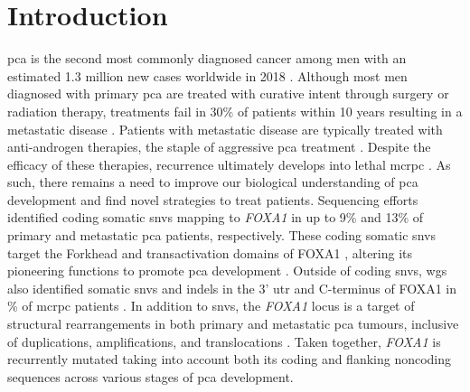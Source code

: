 \section{Introduction}

\Gls{pca} is the second most commonly diagnosed cancer among men with an estimated 1.3 million new cases worldwide in 2018 \cite{brayGlobalCancerStatistics2018}.
Although most men diagnosed with primary \gls{pca} are treated with curative intent through surgery or radiation therapy, treatments fail in 30\% of patients within 10 years \cite{boorjianLongTermOutcomeRadical2007} resulting in a metastatic disease \cite{litwinDiagnosisTreatmentProstate2017}.
Patients with metastatic disease are typically treated with anti-androgen therapies, the staple of aggressive \gls{pca} treatment \cite{attardProstateCancer2016}.
Despite the efficacy of these therapies, recurrence ultimately develops into lethal \gls{mcrpc} \cite{attardProstateCancer2016}.
As such, there remains a need to improve our biological understanding of \gls{pca} development and find novel strategies to treat patients.
Sequencing efforts identified coding somatic \glspl{snv} mapping to \emph{FOXA1} in up to 9\% \cite{abeshouseMolecularTaxonomyPrimary2015,fraserGenomicHallmarksLocalized2017,barbieriExomeSequencingIdentifies2012, grassoMutationalLandscapeLethal2012,paroliaDistinctStructuralClasses2019,adamsFOXA1MutationsAlter2019} and 13\% \cite{paroliaDistinctStructuralClasses2019,adamsFOXA1MutationsAlter2019,robinsonIntegrativeClinicalGenomics2015} of primary and metastatic \gls{pca} patients, respectively.
These coding somatic \glspl{snv} target the Forkhead and transactivation domains of FOXA1 \cite{robinsonFOXA1MutationsHormonedependent2013}, altering its pioneering functions to promote \gls{pca} development \cite{adamsFOXA1MutationsAlter2019,gaoForkheadDomainMutations2019}.
Outside of coding \glspl{snv}, \gls{wgs} also identified somatic \glspl{snv} and indels in the 3' \gls{utr} and C-terminus of FOXA1 in \% of \gls{mcrpc} patients \cite{annalaFrequentMutationFOXA12018}.
In addition to \glspl{snv}, the \emph{FOXA1} locus is a target of structural rearrangements in both primary and metastatic \gls{pca} tumours, inclusive of duplications, amplifications, and translocations \cite{paroliaDistinctStructuralClasses2019,adamsFOXA1MutationsAlter2019}.
Taken together, \emph{FOXA1} is recurrently mutated taking into account both its coding and flanking noncoding sequences across various stages of \gls{pca} development.

